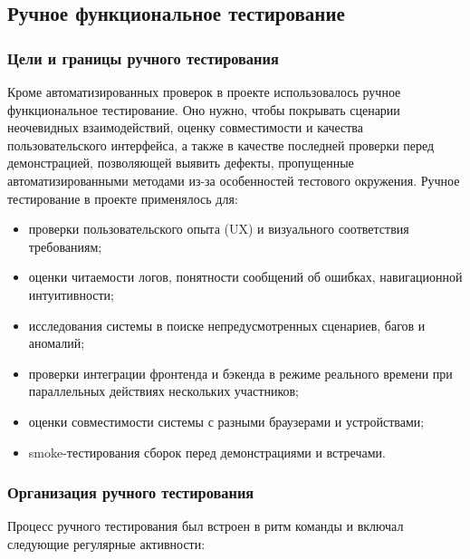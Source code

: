 \subsection{Ручное функциональное тестирование}
\subsubsection{Цели и границы ручного тестирования}
Кроме автоматизированных проверок в проекте использовалось ручное функциональное тестирование. Оно нужно, чтобы покрывать сценарии неочевидных взаимодействий, оценку совместимости и качества пользовательского интерфейса, а также в качестве последней проверки перед демонстрацией, позволяющей выявить дефекты, пропущенные автоматизированными методами из-за особенностей тестового окружения. Ручное тестирование в проекте применялось для:

\begin{itemize}
    \item проверки пользовательского опыта (UX) и визуального соответствия требованиям;
    \item оценки читаемости логов, понятности сообщений об ошибках, навигационной интуитивности;
    \item исследования системы в поиске непредусмотренных сценариев, багов и аномалий;
    \item проверки интеграции фронтенда и бэкенда в режиме реального времени при параллельных действиях нескольких участников;
    \item оценки совместимости системы с разными браузерами и устройствами;
    \item smoke-тестирования сборок перед демонстрациями и встречами.
\end{itemize}

\subsubsection{Организация ручного тестирования}

Процесс ручного тестирования был встроен в ритм команды и включал следующие регулярные активности:

